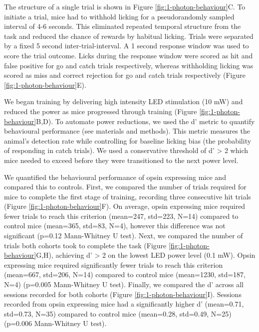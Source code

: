 The structure of a single trial is shown in Figure \ref{fig:1-photon-behaviour}C. To initiate a trial, mice had to withhold licking for a pseudorandomly sampled interval of 4-6 seconds. This eliminated repeated temporal structure from the task and reduced the chance of rewards by habitual licking. Trials were separated by a fixed 5 second inter-trial-interval. A 1 second response window was used to score the trial outcome. Licks during the response window were scored as hit and false positive for go and catch trials respectively, whereas withholding licking was scored as miss and correct rejection for go and catch trials respectively (Figure \ref{fig:1-photon-behaviour}E). 

 We began training by delivering high intensity LED stimulation (10 mW) and reduced the power as mice progressed through training (Figure \ref{fig:1-photon-behaviour}B,D). To automate power reductions, we used the d' metric \cite{brophy_alternatives_1986} to quantify behavioural performance (see materials and methods). This metric measures the animal's detection rate while controlling for baseline licking bias (the probability of responding in catch trials). We used a conservative threshold of d' > 2 which mice needed to exceed before they were transitioned to the next power level.
 
 We quantified the behavioural performance of opsin expressing mice and compared this to controls. First, we compared the number of trials required for mice to complete the first stage of training, recording three consecutive hit trials (Figure \ref{fig:1-photon-behaviour}F). On average, opsin expressing mice required fewer trials to reach this criterion (mean=247, std=223, N=14) compared to control mice (mean=365, std=83, N=4), however this difference was not significant (p=0.12 Mann-Whitney U test). Next, we compared the number of trials both cohorts took to complete the task (Figure \ref{fig:1-photon-behaviour}G,H), achieving d' > 2 on the lowest LED power level (0.1 mW). Opsin expressing mice required significantly fewer trials to reach this criterion (mean=667, std=206, N=14) compared to control mice (mean=1230, std=187, N=4) (p=0.005 Mann-Whitney U test). Finally, we compared the d' across all sessions recorded for both cohorts (Figure \ref{fig:1-photon-behaviour}I). Sessions recorded from opsin expressing mice had a significantly higher d' (mean=0.71, std=0.73, N=35) compared to control mice (mean=0.28, std=0.49, N=25) (p=0.006 Mann-Whitney U test).
 
